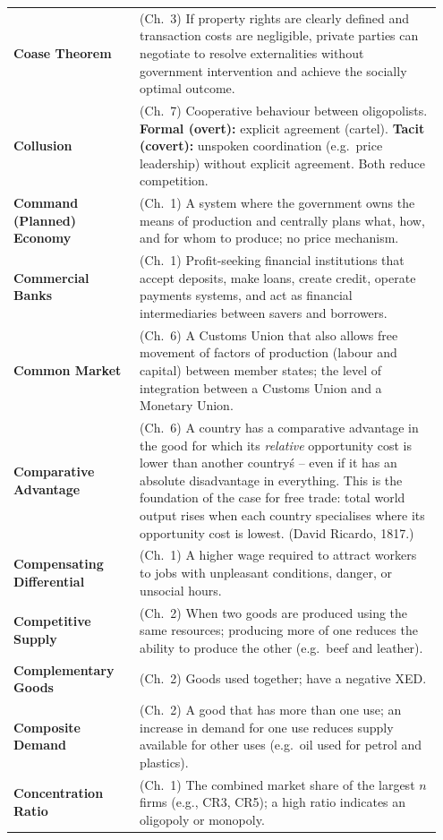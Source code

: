\documentclass[11pt, a4paper, twoside]{book}
\begin{document}
\begin{longtable}{@{}>{\RaggedRight\arraybackslash}p{0.28\linewidth}>{\RaggedRight\arraybackslash}p{0.67\linewidth}@{}}
\textbf{Coase Theorem} & (Ch.~3) If property rights are clearly defined and transaction costs are negligible, private parties can negotiate to resolve externalities without government intervention and achieve the socially optimal outcome. \\
\textbf{Collusion} & (Ch.~7) Cooperative behaviour between oligopolists. \textbf{Formal (overt):} explicit agreement (cartel). \textbf{Tacit (covert):} unspoken coordination (e.g.\ price leadership) without explicit agreement. Both reduce competition. \\
\textbf{Command (Planned) Economy} & (Ch.~1) A system where the government owns the means of production and centrally plans what, how, and for whom to produce; no price mechanism. \\
\textbf{Commercial Banks} & (Ch.~1) Profit-seeking financial institutions that accept deposits, make loans, create credit, operate payments systems, and act as financial intermediaries between savers and borrowers. \\
\textbf{Common Market} & (Ch.~6) A Customs Union that also allows free movement of factors of production (labour and capital) between member states; the level of integration between a Customs Union and a Monetary Union. \\
\textbf{Comparative Advantage} & (Ch.~6) A country has a comparative advantage in the good for which its \textit{relative} opportunity cost is lower than another country\'s -- even if it has an absolute disadvantage in everything. This is the foundation of the case for free trade: total world output rises when each country specialises where its opportunity cost is lowest. (David Ricardo, 1817.) \\
\textbf{Compensating Differential} & (Ch.~1) A higher wage required to attract workers to jobs with unpleasant conditions, danger, or unsocial hours. \\
\textbf{Competitive Supply} & (Ch.~2) When two goods are produced using the same resources; producing more of one reduces the ability to produce the other (e.g.\ beef and leather). \\
\textbf{Complementary Goods} & (Ch.~2) Goods used together; have a negative XED. \\
\textbf{Composite Demand} & (Ch.~2) A good that has more than one use; an increase in demand for one use reduces supply available for other uses (e.g.\ oil used for petrol and plastics). \\
\textbf{Concentration Ratio} & (Ch.~1) The combined market share of the largest $n$ firms (e.g., CR3, CR5); a high ratio indicates an oligopoly or monopoly. \\

\end{longtable}
\end{document}
